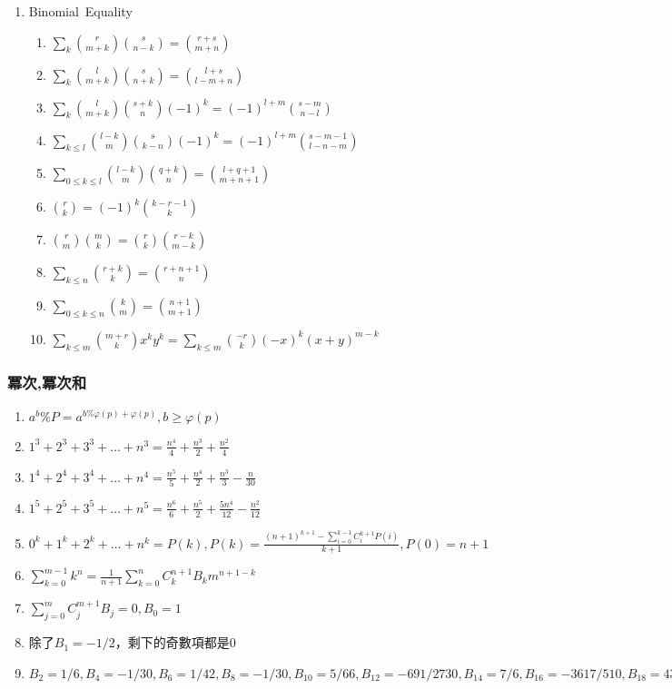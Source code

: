 \begin{enumerate}
\item Binomial\ Equality
	\begin{enumerate}\itemsep = -2pt
	    \item $\sum_k \binom{r}{m + k} \binom{s}{n - k} = \binom{r + s}{m + n}$
         \item $\sum_k \binom{l}{m + k} \binom{s}{n + k} = \binom{l + s}{l -m + n}$		
         \item $\sum_k \binom{l}{m + k} \binom{s + k}{n}(-1)^k = (-1)^{l + m} \binom{s - m}{n - l}$
		\item $\sum_{k\leq l} \binom{l - k}{m} \binom{s}{k - n}(-1)^k = (-1)^{l + m} \binom{s - m - 1}{l - n - m}$
		\item $\sum_{0 \leq k \leq l} \binom{l - k}{m} \binom{q + k}{n} = \binom{l + q + 1}{m + n + 1}$
		\item $\binom{r}{k} = (-1)^k\binom{k - r - 1}{k}$
		\item $\binom{r}{m} \binom{m}{k} = \binom{r}{k} \binom{r - k}{m - k}$
		\item $\sum_{k\leq n} \binom{r + k}{k} = \binom{r + n + 1}{n}$
		\item $\sum_{0\leq k \leq n} \binom{k}{m} = \binom{n + 1}{m + 1}$
		\item $\sum_{k\leq m}\binom{m + r}{k}x^ky^k = \sum_{k\leq m}\binom{-r}{k}(-x)^k (x+y)^{m-k}$	
	\end{enumerate}
\end{enumerate}


\subsubsection{冪次,冪次和}
\begin{enumerate}\itemsep = -3pt
	\item $a^b\%P=a^{b\% \varphi (p)+\varphi (p)},b\geq \varphi (p)$
	\item $1^3+2^3+3^3+\ldots +n^3=\frac{n^4}{4}+\frac{n^3}{2}+\frac{n^2}{4}$
	\item $1^4+2^4+3^4+\ldots +n^4=\frac{n^5}{5}+\frac{n^4}{2}+\frac{n^3}{3}-\frac{n}{30}$
	\item $1^5+2^5+3^5+\ldots +n^5=\frac{n^6}{6}+\frac{n^5}{2}+\frac{5n^4}{12}-\frac{n^2}{12}$
	\item $0^k+1^k+2^k+\ldots +n^k = P(k),P(k)=\frac{(n+1)^{k+1}-\sum_{i=0}^{k-1}C_i^{k+1}P(i)}{k+1},P(0)=n+1$
	\item $\sum_{k=0}^{m-1}k^n=\frac{1}{n+1}\sum_{k=0}^{n}C_k^{n+1}B_km^{n+1-k}$
	\item $\sum_{j=0}^{m}C_j^{m+1}B_j=0,B_0=1$
	\item 除了$B_1=-1/2$，剩下的奇數項都是$0$
	\item $B_2=1/6,B_4=-1/30,B_6=1/42,B_8=-1/30,B_{10}=5/66,B_{12}=-691/2730,B_{14}=7/6,B_{16}=-3617/510,B_{18}=43867/798,B_{20}=-174611/330,$
\end{enumerate}

